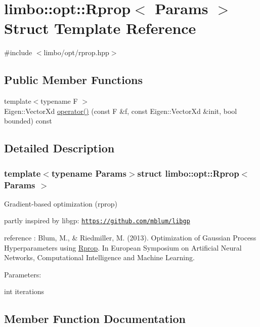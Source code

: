 \hypertarget{structlimbo_1_1opt_1_1_rprop}{}\section{limbo\+:\+:opt\+:\+:Rprop$<$ Params $>$ Struct Template Reference}
\label{structlimbo_1_1opt_1_1_rprop}


{\ttfamily \#include $<$limbo/opt/rprop.\+hpp$>$}

\subsection*{Public Member Functions}
\begin{DoxyCompactItemize}
\item 
{\footnotesize template$<$typename F $>$ }\\Eigen\+::\+Vector\+Xd \hyperlink{structlimbo_1_1opt_1_1_rprop_a6496d5e486ce1a5e8d0959194b8941bb}{operator()} (const F \&f, const Eigen\+::\+Vector\+Xd \&init, bool bounded) const 
\end{DoxyCompactItemize}


\subsection{Detailed Description}
\subsubsection*{template$<$typename Params$>$struct limbo\+::opt\+::\+Rprop$<$ Params $>$}

Gradient-\/based optimization (rprop)
\begin{DoxyItemize}
\item partly inspired by libgp\+: \href{https://github.com/mblum/libgp}{\tt https\+://github.\+com/mblum/libgp}
\item reference \+: Blum, M., \& Riedmiller, M. (2013). Optimization of Gaussian Process Hyperparameters using \hyperlink{structlimbo_1_1opt_1_1_rprop}{Rprop}. In European Symposium on Artificial Neural Networks, Computational Intelligence and Machine Learning.
\end{DoxyItemize}

Parameters\+:
\begin{DoxyItemize}
\item int iterations 
\end{DoxyItemize}

\subsection{Member Function Documentation}
\hypertarget{structlimbo_1_1opt_1_1_rprop_a6496d5e486ce1a5e8d0959194b8941bb}{}
